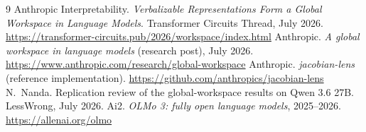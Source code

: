 \documentclass[10pt]{article}
\begin{document}
\begin{thebibliography}{9}\footnotesize
{} Anthropic Interpretability.
\emph{Verbalizable Representations Form a Global Workspace in Language
Models}. Transformer Circuits Thread, July 2026.
\url{https://transformer-circuits.pub/2026/workspace/index.html}
 Anthropic. \emph{A global workspace in language models}
(research post), July 2026.
\url{https://www.anthropic.com/research/global-workspace}
 Anthropic. \emph{jacobian-lens} (reference implementation).
\url{https://github.com/anthropics/jacobian-lens}
 N.~Nanda. Replication review of the global-workspace results
on Qwen 3.6 27B. LessWrong, July 2026.
 Ai2. \emph{OLMo 3: fully open language models}, 2025--2026.
\url{https://allenai.org/olmo}
\end{thebibliography}
\end{document}
